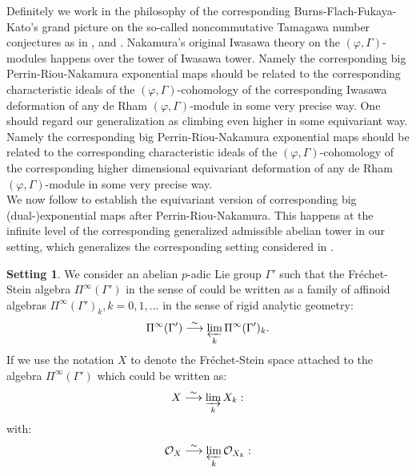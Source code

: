 \documentclass[12pt]{amsart}
\theoremstyle{definition}
\numberwithin{equation}{section}
\newtheorem{setting}[theorem]{Setting}
\begin{document}
\indent Definitely we work in the philosophy of the corresponding Burns-Flach-Fukaya-Kato's grand picture on the so-called noncommutative Tamagawa number conjectures as in \cite{BF1}, \cite{BF2} and \cite{FK}. Nakamura's original Iwasawa theory on the $(\varphi,\Gamma)$-modules happens over the tower of Iwasawa tower. Namely the corresponding big Perrin-Riou-Nakamura exponential maps should be related to the corresponding characteristic ideals of the $(\varphi,\Gamma)$-cohomology of the corresponding Iwasawa deformation of any de Rham $(\varphi,\Gamma)$-module in some very precise way. One should regard our generalization as climbing even higher in some equivariant way. Namely the corresponding big Perrin-Riou-Nakamura exponential maps should be related to the corresponding characteristic ideals of the $(\varphi,\Gamma)$-cohomology of the corresponding higher dimensional equivariant deformation of any de Rham $(\varphi,\Gamma)$-module in some very precise way.\\



\indent We now follow \cite{Nakamura1} to establish the equivariant version of corresponding big (dual-)exponential maps after Perrin-Riou-Nakamura. This happens at the infinite level of the corresponding generalized admissible abelian tower in our setting, which generalizes the corresponding setting considered in \cite{Nakamura1}. 





\begin{setting}
We consider an abelian $p$-adic Lie group $\Gamma'$ such that the Fr\'echet-Stein algebra $\Pi^\infty(\Gamma')$ in the sense of \cite{ST1} could be written as a family of affinoid algebras $\Pi^\infty(\Gamma')_k,k=0,1,...$ in the sense of rigid analytic geometry:
\begin{displaymath}
\Pi^\infty(\Gamma')\overset{\sim}{\longrightarrow} \varprojlim_k \Pi^\infty(\Gamma')_k.
\end{displaymath}
If we use the notation $X$ to denote the Fr\'echet-Stein space attached to the algebra $\Pi^\infty(\Gamma')$ which could be written as:
\begin{displaymath}
X\overset{\sim}{\longrightarrow} \varinjlim_k X_k:	
\end{displaymath}	
with:
\begin{displaymath}
\mathcal{O}_X\overset{\sim}{\longrightarrow} \varprojlim_k \mathcal{O}_{X_k}:	
\end{displaymath}
\end{setting}
\end{document}
